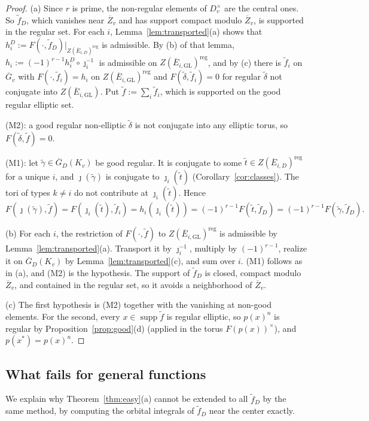 \documentclass[12pt]{article}
\newcommand{\ov}[1]{\overline{#1}}
\newcommand{\reg}{\mathrm{reg}}
\newcommand{\supp}{\operatorname{supp}}
\newcommand{\GL}{\mathrm{GL}}
\newcommand{\Gb}{\ov{G}}
\newcommand{\Zb}{\ov{Z}}
\newcommand{\GDb}{\ov{G}_D}
\newcommand{\Eb}{\ov{E}}
\newcommand{\jj}{\jmath}
\theoremstyle{plain}
\theoremstyle{definition}
\begin{document}
\begin{proof}
(a) Since $r$ is prime, the non-regular elements of $D_v^\times$ are the central ones. So $\tilde f_D$, which vanishes near $\Zb_v$ and has support compact modulo $\Zb_v$, is supported in the regular set. For each $i$, Lemma~\ref{lem:transported}(a) shows that $h_i^D:=F(\cdot,\tilde f_D)|_{Z(\Eb_{i,D})^{\reg}}$ is admissible. By (b) of that lemma, $h_i:=(-1)^{r-1}h_i^D\circ\jj_i^{-1}$ is admissible on $Z(\Eb_{i,\GL})^{\reg}$, and by (c) there is $\tilde f_i$ on $\Gb_v$ with $F(\cdot,\tilde f_i)=h_i$ on $Z(\Eb_{i,\GL})^{\reg}$ and $F(\tilde\delta,\tilde f_i)=0$ for regular $\tilde\delta$ not conjugate into $Z(\Eb_{i,\GL})$. Put $\tilde f:=\sum_i\tilde f_i$, which is supported on the good regular elliptic set.

(M2): a good regular non-elliptic $\tilde\delta$ is not conjugate into any elliptic torus, so $F(\tilde\delta,\tilde f)=0$.

(M1): let $\tilde\gamma\in\GDb(K_v)$ be good regular. It is conjugate to some $\tilde t\in Z(\Eb_{i,D})^{\reg}$ for a unique $i$, and $\jj(\tilde\gamma)$ is conjugate to $\jj_i(\tilde t)$ (Corollary~\ref{cor:classes}). The tori of types $k\ne i$ do not contribute at $\jj_i(\tilde t)$. Hence
\[ F(\jj(\tilde\gamma),\tilde f)=F(\jj_i(\tilde t),\tilde f_i)=h_i(\jj_i(\tilde t))=(-1)^{r-1}F(\tilde t,\tilde f_D)=(-1)^{r-1}F(\tilde\gamma,\tilde f_D). \]

(b) For each $i$, the restriction of $F(\cdot,\tilde f)$ to $Z(\Eb_{i,\GL})^{\reg}$ is admissible by Lemma~\ref{lem:transported}(a). Transport it by $\jj_i^{-1}$, multiply by $(-1)^{r-1}$, realize it on $\GDb(K_v)$ by Lemma~\ref{lem:transported}(c), and sum over $i$. (M1) follows as in (a), and (M2) is the hypothesis. The support of $\tilde f_D$ is closed, compact modulo $\Zb_v$, and contained in the regular set, so it avoids a neighborhood of $\Zb_v$.

(c) The first hypothesis is (M2) together with the vanishing at non-good elements. For the second, every $x\in\supp\tilde f$ is regular elliptic, so $p(x)^n$ is regular by Proposition~\ref{prop:good}(d) (applied in the torus $F(p(x))^\times$), and $p(x^*)=p(x)^n$.
\end{proof}

\subsection{What fails for general functions}\label{subsec:general}
We explain why Theorem~\ref{thm:easy}(a) cannot be extended to all $\tilde f_D$ by the same method, by computing the orbital integrals of $\tilde f_D$ near the center exactly.
\end{document}
